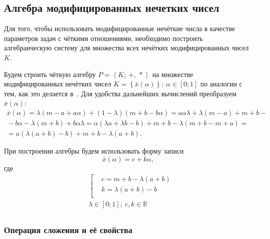 \subsection{Алгебра модифицированных нечетких чисел}
Для того, чтобы использовать модифицированные нечёткие числа в качестве параметров задач с чёткими отношениями, необходимо построить алгебраическую систему для множества всех нечётких модифицированных чисел $K$.

Будем строить чёткую алгебру $P=\left\langle K ;\ +,\,* \right\rangle$ на множестве модифицированных нечётких чисел $K=\left\{ \bar{x}\left( \alpha  \right) \right\};\ \alpha \in \left[ 0;1 \right]$ по аналогии с тем, как это делается в~\cite{Yakhyaeva}. Для удобства дальнейших вычислений преобразуем $\bar{x}\left( \alpha \right)$:
\begin{gather*}
  \bar{x}\left( \alpha  \right)=\lambda \left( m-a+a\alpha  \right)+\left( 1-\lambda  \right)\left( m+b-b\alpha  \right)=a\alpha \lambda +\lambda \left( m-a \right)+m+b-{}\\
  {}-b\alpha -\lambda \left( m+b \right)+b\alpha \lambda =\alpha \left( \lambda a+\lambda b-b \right)+m+b-\lambda \left( m+b-m+a \right)={}\\
  {}=a\left( \lambda \left( a+b \right)-b \right)+m+b-\lambda \left( a+b \right).
\end{gather*}

При построении алгебры будем использовать форму записи
\begin{equation}
\label{eq:modified-number-base}
  \bar{x}\left( \alpha  \right)=c+k\alpha,
\end{equation}
где
\begin{equation}
\label{eq:modified-number-from-abm}
  \begin{aligned}
    & \left[ \begin{aligned}
    & c=m+b-\lambda \left( a+b \right) \\ 
    & k=\lambda \left( a+b \right)-b \\ 
  \end{aligned} \right. \\ 
  & \lambda \in \left[ 0;1 \right];\ c,k\in \mathbb{R} \\ 
\end{aligned}
\end{equation}

\subsubsection*{Операция сложения и её свойства}

